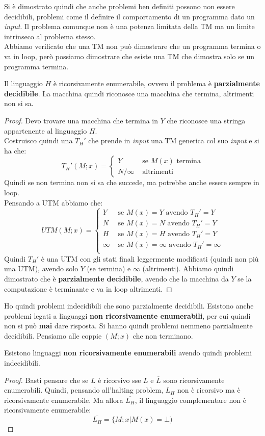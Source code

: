 Si è dimostrato quindi che anche problemi ben definiti possono non essere
decidibili, problemi come il definire il comportamento di un programma dato un
\textit{input}. Il problema comunque non è una potenza limitata della TM ma un limite
intrinseco al problema stesso. \\ Abbiamo verificato che una TM non può dimostrare che un programma termina o va in loop, però possiamo dimostrare che esiste una TM che dimostra solo se un programma termina.
\begin{definizione}
  Il linguaggio $H$ è ricorsivamente enumerabile, ovvero il problema è
  \textbf{parzialmente decidibile}. La macchina quindi riconosce una macchina
  che termina, altrimenti non si sa.  
\end{definizione}
\begin{proof}
  Devo trovare una macchina che termina in $Y$ che riconosce una stringa
  appartenente al linguaggio $H$.\\
  Costruisco quindi una $T_H'$ che prende in \textit{input} una TM generica col suo
  \textit{input} e si ha che:
  \[T_H'(M;x)=
   \begin{cases}
     Y &\mbox{ se } M(x)\mbox{ termina}\\
     N/\infty &\mbox{ altrimenti}
    \end{cases}
  \]
  Quindi se non termina non si sa che succede, ma potrebbe anche essere sempre
  in loop.\\
  Pensando a UTM abbiamo che:
  \[UTM(M;x)=
   \begin{cases}
     Y &\mbox{ se } M(x)=Y\mbox{ avendo }T_H'=Y\\
     N &\mbox{ se } M(x)=N\mbox{ avendo }T_H'=Y\\
     H &\mbox{ se } M(x)=H\mbox{ avendo }T_H'=Y\\
     \infty &\mbox{ se } M(x)=\infty\mbox{ avendo }T_H'=\infty\\
    \end{cases}
  \]
  Quindi $T_H'$ è una UTM con gli stati finali leggermente modificati (quindi
  non più una UTM), avendo
  solo $Y$ (se termina) e $\infty$ (altrimenti). Abbiamo quindi dimostrato che è
  \textbf{parzialmente decidibile}, avendo che la macchina da $Y$ se la
  computazione è terminante e va in loop altrimenti.
\end{proof}
Ho quindi problemi indecidibili che sono parzialmente decidibili. Esistono
anche problemi legati a linguaggi \textbf{non ricorsivamente enumerabili}, per
cui quindi non si può \textbf{mai} dare risposta. Si hanno quindi problemi
nemmeno parzialmente decidibili. Pensiamo alle coppie $(M;x)$ che non terminano.
\begin{definizione}
   Esistono linguaggi \textbf{non ricorsivamente enumerabili} avendo quindi
   problemi indecidibili.
\end{definizione}
\begin{proof}
  Basti pensare che se $L$ è ricorsivo sse $L$ e $\overline{L}$ sono ricorsivamente
  enumerabili. Quindi, pensando all'halting problem, $L_H$ non è ricorsivo ma
  è ricorsivamente enumerabile. Ma allora $\overline{L_H}$, il linguaggio
  complementare non è ricorsivamente enumerabile: 
  \[\overline{L_H}=\{M;x|M(x)=\bot)\]
\end{proof}
